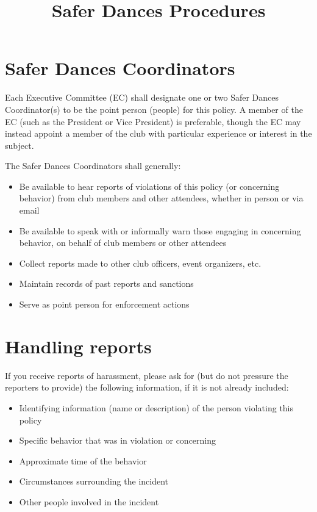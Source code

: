\documentclass{article}
\title{Safer Dances Procedures}
\date{}
\begin{document}
\maketitle

\section{Safer Dances Coordinators}

Each Executive Committee (EC) shall designate one or two Safer Dances Coordinator(s) to be the point person (people) for this policy. A member of the EC (such as the President or Vice President) is preferable, though the EC may instead appoint a member of the club with particular experience or interest in the subject.

The Safer Dances Coordinators shall generally:
\begin{itemize}
\item Be available to hear reports of violations of this policy (or concerning behavior) from club members and other attendees, whether in person or via email
\item Be available to speak with or informally warn those engaging in concerning behavior, on behalf of club members or other attendees
\item Collect reports made to other club officers, event organizers, etc.
\item Maintain records of past reports and sanctions
\item Serve as point person for enforcement actions
\end{itemize}


\section{Handling reports}

If you receive reports of harassment, please ask for (but do not pressure the reporters to provide) the following information, if it is not already included:

\begin{itemize}
\item Identifying information (name or description) of the person violating this policy
\item Specific behavior that was in violation or concerning
\item Approximate time of the behavior
\item Circumstances surrounding the incident
\item Other people involved in the incident
\end{itemize}
\end{document}
